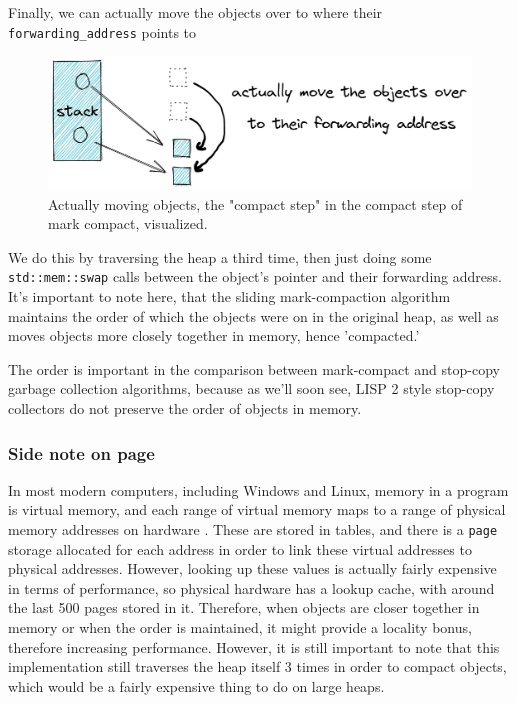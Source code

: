 \documentclass[index]{subfiles}
\begin{document}
Finally, we can actually move the objects over to where their \verb+forwarding_address+ points to

\begin{figure}[H]
    \centering
    \includegraphics[scale=0.3]{pics/actually-move.png}
    \caption{Actually moving objects, the "compact step" in the compact step of mark compact, visualized.}
\end{figure}

We do this by traversing the heap a third time, then just doing some \texttt{std::mem::swap} calls between the object's pointer and their forwarding address. It's important to note here, that the sliding mark-compaction algorithm maintains the order of which the objects were on in the original heap, as well as moves objects more closely together in memory, hence 'compacted.'

The order is important in the comparison between mark-compact and stop-copy garbage collection algorithms, because as we'll soon see, LISP 2 style stop-copy collectors do not preserve the order of objects in memory.

\subsubsection{Side note on page}

In most modern computers, including Windows and Linux, memory in a program is virtual memory, and each range of virtual memory maps to a range of physical memory addresses on hardware \cite{code_project}. These are stored in tables, and there is a \verb+page+ storage allocated for each address in order to link these virtual addresses to physical addresses. However, looking up these values is actually fairly expensive in terms of performance, so physical hardware has a lookup cache, with around the last 500 pages stored in it. Therefore, when objects are closer together in memory or when the order is maintained, it might provide a locality bonus, therefore increasing performance. However, it is still important to note that this implementation still traverses the heap itself 3 times in order to compact objects, which would be a fairly expensive thing to do on large heaps.
\end{document}
